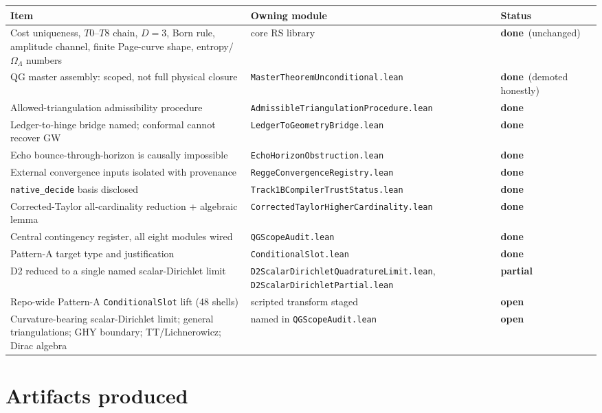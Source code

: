 \documentclass[11pt,letterpaper]{article}
\newcommand{\lmod}[1]{\texttt{#1}}
\newcommand{\sdone}{{\color{green!55!black}\textbf{done}}}
\newcommand{\sopen}{{\color{red!70!black}\textbf{open}}}
\newcommand{\spart}{{\color{orange!85!black}\textbf{partial}}}
\begin{document}
\begin{center}
\footnotesize
\renewcommand{\arraystretch}{1.2}
\begin{tabular}{p{6.6cm}p{4.4cm}l}
\toprule
\textbf{Item} & \textbf{Owning module} & \textbf{Status} \\
\midrule
Cost uniqueness, $T0$--$T8$ chain, $D{=}3$, Born rule, amplitude channel,
finite Page-curve shape, entropy/$\Omega_\Lambda$ numbers & core RS library
& \sdone\ (unchanged) \\
QG master assembly: scoped, not full physical closure
& \lmod{MasterTheoremUnconditional.lean} & \sdone\ (demoted honestly) \\
Allowed-triangulation admissibility procedure
& \lmod{AdmissibleTriangulationProcedure.lean} & \sdone \\
Ledger-to-hinge bridge named; conformal cannot recover GW
& \lmod{LedgerToGeometryBridge.lean} & \sdone \\
Echo bounce-through-horizon is causally impossible
& \lmod{EchoHorizonObstruction.lean} & \sdone \\
External convergence inputs isolated with provenance
& \lmod{ReggeConvergenceRegistry.lean} & \sdone \\
\texttt{native\_decide} basis disclosed
& \lmod{Track1BCompilerTrustStatus.lean} & \sdone \\
Corrected-Taylor all-cardinality reduction + algebraic lemma
& \lmod{CorrectedTaylorHigherCardinality.lean} & \sdone \\
Central contingency register, all eight modules wired
& \lmod{QGScopeAudit.lean} & \sdone \\
Pattern-A target type and justification
& \lmod{ConditionalSlot.lean} & \sdone \\
D2 reduced to a single named scalar-Dirichlet limit
& \lmod{D2ScalarDirichletQuadratureLimit.lean}, \lmod{D2ScalarDirichletPartial.lean}
& \spart \\
Repo-wide Pattern-A \texttt{ConditionalSlot} lift (48 shells)
& scripted transform staged & \sopen \\
Curvature-bearing scalar-Dirichlet limit; general triangulations; GHY boundary;
TT/Lichnerowicz; Dirac algebra & named in \lmod{QGScopeAudit.lean} & \sopen \\
\bottomrule
\end{tabular}
\end{center}

\section{Artifacts produced}
\label{sec:artifacts}
\end{document}
